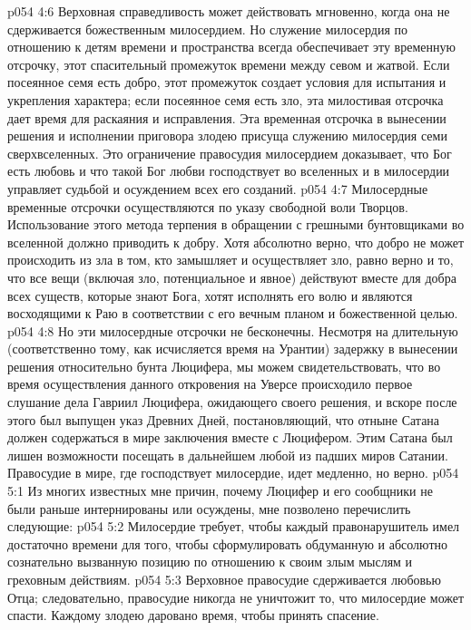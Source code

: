 \vs p054 4:6 Верховная справедливость может действовать мгновенно, когда она не сдерживается божественным милосердием. Но служение милосердия по отношению к детям времени и пространства всегда обеспечивает эту временную отсрочку, этот спасительный промежуток времени между севом и жатвой. Если посеянное семя есть добро, этот промежуток создает условия для испытания и укрепления характера; если посеянное семя есть зло, эта милостивая отсрочка дает время для раскаяния и исправления. Эта временная отсрочка в вынесении решения и исполнении приговора злодею присуща служению милосердия семи сверхвселенных. Это ограничение правосудия милосердием доказывает, что Бог есть любовь и что такой Бог любви господствует во вселенных и в милосердии управляет судьбой и осуждением всех его созданий.
\vs p054 4:7 Милосердные временные отсрочки осуществляются по указу свободной воли Творцов. Использование этого метода терпения в обращении с грешными бунтовщиками во вселенной должно приводить к добру. Хотя абсолютно верно, что добро не может происходить из зла в том, кто замышляет и осуществляет зло, равно верно и то, что все вещи (включая зло, потенциальное и явное) действуют вместе для добра всех существ, которые знают Бога, хотят исполнять его волю и являются восходящими к Раю в соответствии с его вечным планом и божественной целью.
\vs p054 4:8 Но эти милосердные отсрочки не бесконечны. Несмотря на длительную (соответственно тому, как исчисляется время на Урантии) задержку в вынесении решения относительно бунта Люцифера, мы можем свидетельствовать, что во время осуществления данного откровения на Уверсе происходило первое слушание дела Гавриил  Люцифера, ожидающего своего решения, и вскоре после этого был выпущен указ Древних Дней, постановляющий, что отныне Сатана должен содержаться в мире заключения вместе с Люцифером. Этим Сатана был лишен возможности посещать в дальнейшем любой из падших миров Сатании. Правосудие в мире, где господствует милосердие, идет медленно, но верно.
\vs p054 5:1 Из многих известных мне причин, почему Люцифер и его сообщники не были раньше интернированы или осуждены, мне позволено перечислить следующие:
\vs p054 5:2 \bibnobreakspace Милосердие требует, чтобы каждый правонарушитель имел достаточно времени для того, чтобы сформулировать обдуманную и абсолютно сознательно вызванную позицию по отношению к своим злым мыслям и греховным действиям.
\vs p054 5:3 \pc {}\bibnobreakspace Верховное правосудие сдерживается любовью Отца; следовательно, правосудие никогда не уничтожит то, что милосердие может спасти. Каждому злодею даровано время, чтобы принять спасение.
